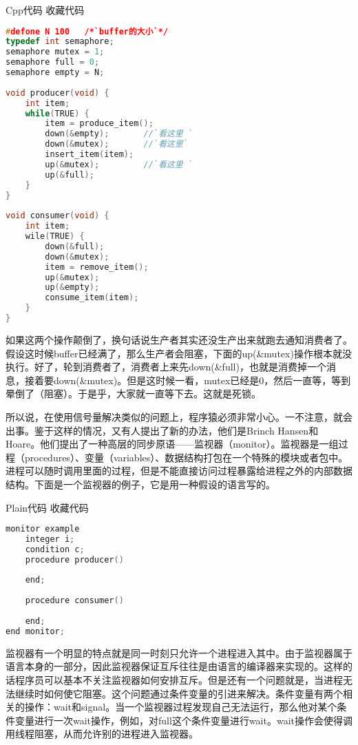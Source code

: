 \documentclass{article}
\begin{document}
\begin{CJK}{UTF8}{gbsn}
Cpp代码  收藏代码
\begin{lstlisting}[language=c++]
#defone N 100   /*`buffer的大小`*/  
typedef int semaphore;  
semaphore mutex = 1;  
semaphore full = 0;  
semaphore empty = N;  
  
void producer(void) {  
    int item;  
    while(TRUE) {  
        item = produce_item();  
        down(&empty);       //`看这里 ` 
        down(&mutex);       //`看这里`  
        insert_item(item);  
        up(&mutex);         //`看这里 ` 
        up(&full);  
    }  
}  
  
void consumer(void) {  
    int item;  
    wile(TRUE) {  
        down(&full);  
        down(&mutex);  
        item = remove_item();  
        up(&mutex);  
        up(&empty);  
        consume_item(item);  
    }  
}  
\end{lstlisting}
    如果这两个操作颠倒了，换句话说生产者其实还没生产出来就跑去通知消费者了。假设这时候buffer已经满了，那么生产者会阻塞，下面的up(\&mutex)操作根本就没执行。好了，轮到消费者了，消费者上来先down(\&full)，也就是消费掉一个消息，接着要down(\&mutex)。但是这时候一看，mutex已经是0，然后一直等，等到晕倒了（阻塞）。于是乎，大家就一直等下去。这就是死锁。
 
    所以说，在使用信号量解决类似的问题上，程序猿必须非常小心。一不注意，就会出事。鉴于这样的情况，又有人提出了新的办法，他们是Brinch Hansen和Hoare。他们提出了一种高层的同步原语——监视器（monitor）。监视器是一组过程（procedures）、变量（variables）、数据结构打包在一个特殊的模块或者包中。进程可以随时调用里面的过程，但是不能直接访问过程暴露给进程之外的内部数据结构。下面是一个监视器的例子，它是用一种假设的语言写的。
 
Plain代码  收藏代码
\begin{lstlisting}[language=c++]
monitor example  
    integer i;  
    condition c;  
    procedure producer()  
          
    end;  
  
    procedure consumer()  
  
    end;  
end monitor;  
\end{lstlisting}
    监视器有一个明显的特点就是同一时刻只允许一个进程进入其中。由于监视器属于语言本身的一部分，因此监视器保证互斥往往是由语言的编译器来实现的。这样的话程序员可以基本不关注监视器如何安排互斥。但是还有一个问题就是，当进程无法继续时如何使它阻塞。这个问题通过条件变量的引进来解决。条件变量有两个相关的操作：wait和signal。当一个监视器过程发现自己无法运行，那么他对某个条件变量进行一次wait操作，例如，对full这个条件变量进行wait。wait操作会使得调用线程阻塞，从而允许别的进程进入监视器。
 

\end{CJK}
\end{document}
